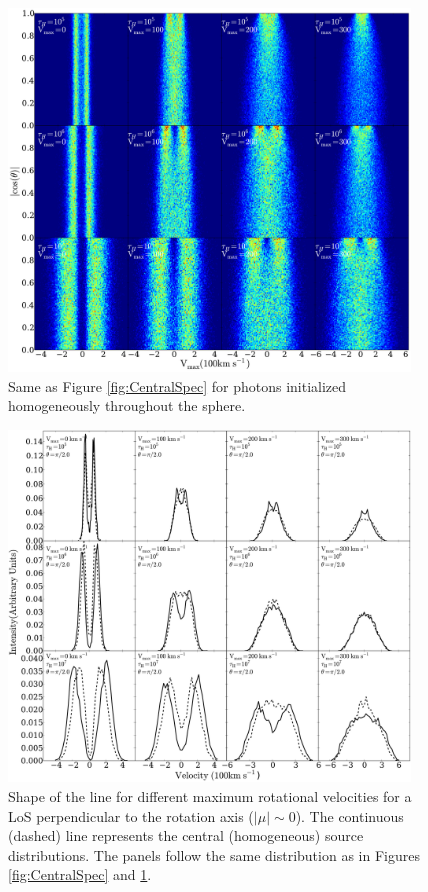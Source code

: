 \documentclass{emulateapj}
\newcommand{\ly}{{\ifmmode{{\rm Ly}\alpha~}\else{Ly$\alpha$~}\fi}}
\begin{document}
\begin{figure}
\begin{center}
  \includegraphics[width=0.95\textwidth]{f3.pdf}
\end{center}
\caption{Same as Figure \ref{fig:CentralSpec} for \ly photons
  initialized homogeneously throughout the sphere.
    \label{fig:HomSpec}}  
\end{figure}

\begin{figure}
\begin{center}
  \includegraphics[width=0.95\textwidth]{f4.pdf}
\end{center}
\caption{Shape of the \ly line for different maximum rotational
  velocities for a LoS perpendicular to the rotation axis
  ($|\mu|\sim 0$). The continuous (dashed) line represents the central
  (homogeneous) source distributions.  The panels follow the same
  distribution as in Figures \ref{fig:CentralSpec} and \ref{fig:HomSpec}.
    \label{fig:differentvelocities}}  
\end{figure}
\end{document}
